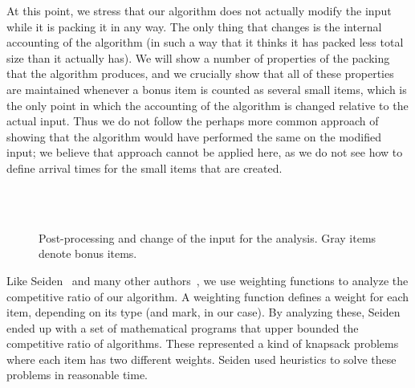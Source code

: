 At this point, we stress that our algorithm does not actually modify the input while it is packing it in any way. The only thing that changes is the internal accounting of the algorithm (in such a way that it thinks it has packed less total size than it actually has). We will show a number of properties of the packing that the algorithm produces, and we crucially show that all of these properties are maintained whenever a bonus item is counted as several small items, which is the only point in which the accounting of the algorithm is changed relative to the actual input. Thus we do not follow the perhaps more common approach of showing that the algorithm would have performed the same on the modified input; we believe that approach cannot be applied here, as we do not see how to define arrival times for the small items that are created.


\begin{figure}[t]
	\begin{center}
	\end{center}
	\\
	\\
	\caption{Post-processing and change of the input for the analysis. Gray items denote bonus items.
	\label{fig:post-processing}}
\end{figure}

Like Seiden~\cite{Seiden02} and many other authors~\cite{Ullman71,LeeLee85,RaBrLL89}, we use weighting functions to analyze the competitive ratio of our algorithm. 
A weighting function defines a weight for each item, depending on its type (and mark, in our case). 
By analyzing these, 
Seiden ended up with a set of mathematical programs that upper bounded
the competitive ratio of {\SuperH} algorithms. These
represented a kind of knapsack problems where each item has two
different weights.
Seiden used heuristics to solve these problems in reasonable time.


